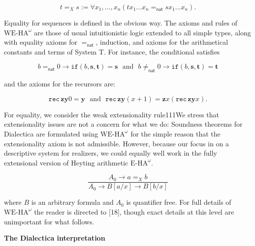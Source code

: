\documentclass[10pt,a4paper]{article}
\begin{document}
\par  \quad  \[t=_{X}s:=\forall x_{1},\ldots,x_{n}(tx_{1}\ldots x_{n}=_{\mathsf{nat}}sx_{1}\ldots x_{n}).\]\quad  \quad  
  
Equality for sequences is defined in the obvious way. The axioms and rules of $\mathrm{WE}\mbox{-}\mathrm{HA}^{\omega}$ are those of usual intuitionistic logic extended to all simple types, along with equality axioms for $=_{\mathsf{nat}}$, induction, and axioms for the arithmetical constants and terms of System T. For instance, the conditional satisfies\par
  
\par  \quad  \[b=_{\mathsf{nat}}0\to\mathtt{if}({b},{\bm{s}},{\bm{t}})=\bm{s}\ \ \ \mbox{and}\ \ \ b\neq_{\mathsf{nat}}0\to\mathtt{if}({b},{\bm{s}},{\bm{t}})=\bm{t}\]\quad  \quad  
  
and the axioms for the recursors are:\par
  
\par  \quad  \[\mathtt{rec}\,\bm{z}\bm{y}0=\bm{y}\ \ \ \mbox{and}\ \ \ \mathtt{rec}\,\bm{z}\bm{y}(x+1)=\bm{z}x(\mathtt{rec}\,\bm{z}\bm{y}x).\]\quad  \quad  
  
For equality, we consider the weak extensionality rule111We stress that extensionality issues are not a concern for what we do: Soundness theorems for Dialectica are formulated using $\mathrm{WE}\mbox{-}\mathrm{HA}^{\omega}$ for the simple reason that the extensionality axiom is not admissible. However, because our focus in on a descriptive system for realizers, we could equally well work in the fully extensional version of Heyting arithmetic $\mathrm{E}\mbox{-}\mathrm{HA}^{\omega}$.\par
  
\par  \quad  \[\frac{A_{0}\to a=_{X}b}{A_{0}\to B[a/x]\to B[b/x]}\]\quad  \quad  
  
where $B$ is an arbitrary formula and $A_{0}$ is quantifier free. For full details of $\mathrm{WE}\mbox{-}\mathrm{HA}^{\omega}$ the reader is directed to [18], though exact details at this level are unimportant for what follows.\par
 
 
 
 
\par\medskip\noindent\textbf{The Dialectica interpretation}\par
 
\end{document}
